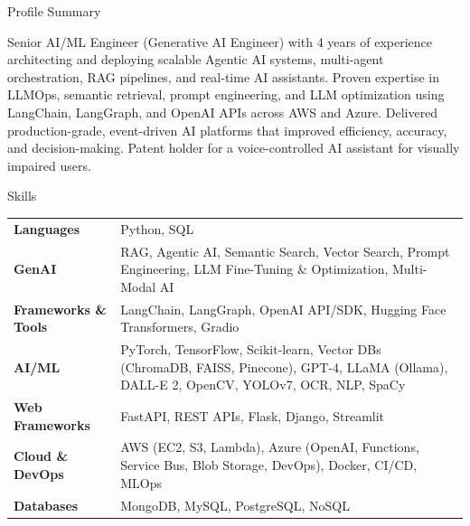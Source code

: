 \documentclass{resume} %
\begin{document}

\begin{rSection}{Profile Summary}

Senior AI/ML Engineer (Generative AI Engineer) with 4 years of experience architecting and deploying scalable Agentic AI systems, multi-agent orchestration, RAG pipelines, and real-time AI assistants. Proven expertise in LLMOps, semantic retrieval, prompt engineering, and LLM optimization using LangChain, LangGraph, and OpenAI APIs across AWS and Azure. Delivered production-grade, event-driven AI platforms that improved efficiency, accuracy, and decision-making. Patent holder for a voice-controlled AI assistant for visually impaired users.

\end{rSection}


\begin{rSection}{Skills}

\renewcommand{\arraystretch}{0.9}
\begin{tabular}{@{} >{\bfseries}p{1.9in} p{5.6in} @{}}
Languages & Python, SQL \\
GenAI & RAG, Agentic AI, Semantic Search, Vector Search, Prompt Engineering, LLM Fine-Tuning \& Optimization, Multi-Modal AI \\
Frameworks \& Tools & LangChain, LangGraph, OpenAI API/SDK, Hugging Face Transformers, Gradio \\
AI/ML & PyTorch, TensorFlow, Scikit-learn, Vector DBs (ChromaDB, FAISS, Pinecone), GPT-4, LLaMA (Ollama), DALL-E 2, OpenCV, YOLOv7, OCR, NLP, SpaCy \\
Web Frameworks & FastAPI, REST APIs, Flask, Django, Streamlit \\
Cloud \& DevOps & AWS (EC2, S3, Lambda), Azure (OpenAI, Functions, Service Bus, Blob Storage, DevOps), Docker, CI/CD, MLOps \\
Databases & MongoDB, MySQL, PostgreSQL, NoSQL \\
\end{tabular}

\end{rSection}
\end{document}
